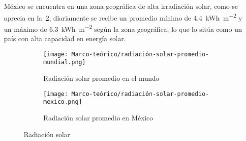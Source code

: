 			México se encuentra en una zona geográfica de alta irradiación solar, como se aprecia en la~\cref{fig:radiacion-solar-promedio-mexico}, diariamente se recibe un promedio mínimo de \SI{4.4}{\kWh\per\m\tothe{2}} y un máximo de \SI{6.3}{\kWh\per\m\tothe{2}} según la zona geográfica, lo que lo sitúa como un país con alta capacidad en energía solar.

			\begin{figure}[H]
			\centering
			\begin{subfigure}[b]{0.45\textwidth}
				\centering
				\texttt{[image: Marco-teórico/radiación-solar-promedio-mundial.png]}
				\caption{Radiación solar promedio en el mundo}
				\label{fig:radiacion-solar-promedio-mundial}
			\end{subfigure}
			\hfill
			\begin{subfigure}[b]{0.45\textwidth}
				\centering
				\texttt{[image: Marco-teórico/radiación-solar-promedio-mexico.png]}
				\caption{Radiación solar promedio en México}
				\label{fig:radiacion-solar-promedio-mexico}
			\end{subfigure}
			\caption{Radiación solar}
			\label{fig:radiacion-solar}
		\end{figure}